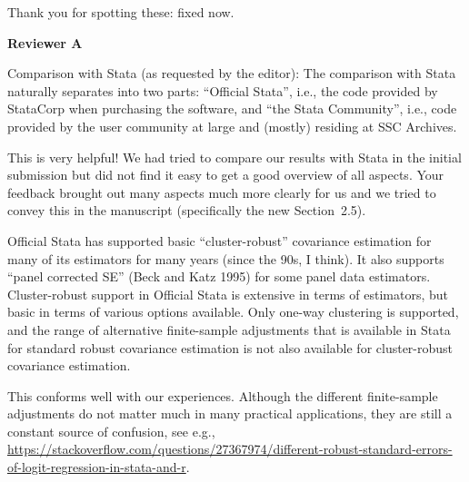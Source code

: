 \documentclass[american,foldmarks=false]{uibklttr}
\newenvironment{review}{\fontshape{\itdefault}\fontseries{\bfdefault} \selectfont \smallskip}{\par}
\begin{document}
Thank you for spotting these: fixed now.


\newpage


\textbf{\LARGE Reviewer A}

\begin{review}
Comparison with Stata (as requested by the editor):
%
The comparison with Stata naturally separates into two parts: ``Official
Stata'', i.e., the code provided by StataCorp when purchasing the software, and
``the Stata Community'', i.e., code provided by the user community at large and
(mostly) residing at SSC Archives.
\end{review}

This is very helpful! We had tried to compare our results with Stata in the
initial submission but did not find it easy to get a good overview of all
aspects. Your feedback brought out many aspects much more clearly for us and
we tried to convey this in the manuscript (specifically the new Section~2.5).


\begin{review}
Official Stata has supported basic ``cluster-robust'' covariance estimation for
many of its estimators for many years (since the 90s, I think).  It also
supports ``panel corrected SE'' (Beck and Katz 1995) for some panel data
estimators.  Cluster-robust support in Official Stata is extensive in terms of
estimators, but basic in terms of various options available.  Only one-way
clustering is supported, and the range of alternative finite-sample adjustments
that is available in Stata for standard robust covariance estimation is not also
available for cluster-robust covariance estimation.
\end{review}

This conforms well with our experiences. Although the different finite-sample
adjustments do not matter much in many practical applications, they are still
a constant source of confusion, see e.g.,
\url{https://stackoverflow.com/questions/27367974/different-robust-standard-errors-of-logit-regression-in-stata-and-r}.
\end{document}
